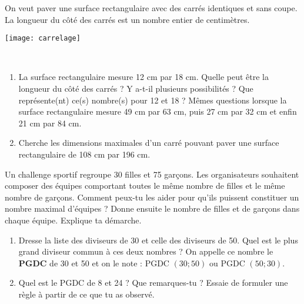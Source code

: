

\begin{activite}

\begin{partie}
 \begin{minipage}[c]{0.5\textwidth}
On veut paver une surface rectangulaire avec des carrés identiques et sans coupe. La longueur du côté des carrés est un nombre entier de centimètres.
 \end{minipage} \hfill%
 \begin{minipage}[c]{0.4\textwidth}
  \texttt{[image: carrelage]}
  \end{minipage} \\
 \begin{enumerate}
  \item La surface rectangulaire mesure 12 cm par 18 cm. Quelle peut être la longueur du côté des carrés ? Y a-t-il plusieurs possibilités ? Que représente(nt) ce(s) nombre(s) pour 12 et 18 ? Mêmes questions lorsque la surface rectangulaire mesure 49 cm par 63 cm, puis 27 cm par 32 cm et enfin 21 cm par 84 cm.
  \item Cherche les dimensions maximales d'un carré pouvant paver une surface rectangulaire de 108 cm par 196 cm.
  \end{enumerate}
\end{partie}

\begin{partie}
Un challenge sportif regroupe 30 filles et 75 garçons. Les organisateurs souhaitent composer des équipes comportant toutes le même nombre de filles et le même nombre de garçons. Comment peux-tu les aider pour qu'ils puissent constituer un nombre maximal d'équipes ? Donne ensuite le nombre de filles et de garçons dans chaque équipe. Explique ta démarche.
\end{partie}

\begin{partie}[PGDC]
\begin{enumerate}
 \item Dresse la liste des diviseurs de 30 et celle des diviseurs de 50. Quel est le plus grand diviseur commun à ces deux nombres ? On appelle ce nombre le \textbf{PGDC} de 30 et 50 et on le note : PGDC $(30 ; 50)$ ou PGDC $(50 ; 30)$.
 \item Quel est le PGDC de 8 et 24 ? Que remarques-tu ? Essaie de formuler une règle à partir de ce que tu as observé.
 \end{enumerate}
\end{partie}

\end{activite}

